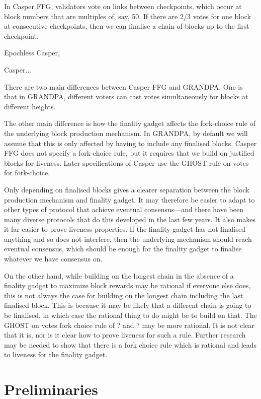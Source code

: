 \documentclass{article}
\begin{document}
In Casper FFG\cite{CasperFFG}, validators vote on links between checkpoints, which occur at block numbers that are multiples of, say, 50. If there are 2/3 votes for one block at consecutive checkpoints, then we can finalise a chain of blocks up to the first checkpoint.

Epochless Casper, 

Casper...

There are two main differences between Casper FFG and GRANDPA. One is that in GRANDPA, different voters can cast votes simultaneously for blocks at different heights.

The other main difference is how the finality gadget affects the fork-choice rule of the underlying block production mechanism. In GRANDPA, by default we will assume that this is only affected by having to include any finalised blocks. 
Casper FFG \cite{CasperFFG} does not specify a fork-choice rule, but it requires that we build on justified blocks for liveness. Later specifications of Casper use the GHOST rule on votes for fork-choice.

Only depending on finalised blocks gives a clearer separation between the block production mechanism and finality gadget. It may therefore be easier to adapt to other types of protocol that achieve eventual consensus—and there have been many diverse protocols that do this developed in the last few years.
It also makes it far easier to prove liveness properties.
If the finality gadget has not finalised anything and so does not interfere, then the underlying mechanism should reach eventual consensus, which should be enough for the finality gadget to finalise whatever we have consensus on.

On the other hand, while building on the longest chain in the absence of a finality gadget to maximize block rewards may be rational if everyone else does, this is not always the case for building on the longest chain including the last finalised block.
This is because it may be likely that a different chain is going to be finalised, in which case the rational thing to do might be to build on that. The GHOST on votes fork choice rule of ? and ? may be more rational.
It is not clear that it is, nor is it clear how to prove liveness for such a rule. Further research may be needed to show that there is a fork choice rule which is rational and leads to liveness for the finality gadget. 




\section{Preliminaries} \label{sec:prelims}
\end{document}
